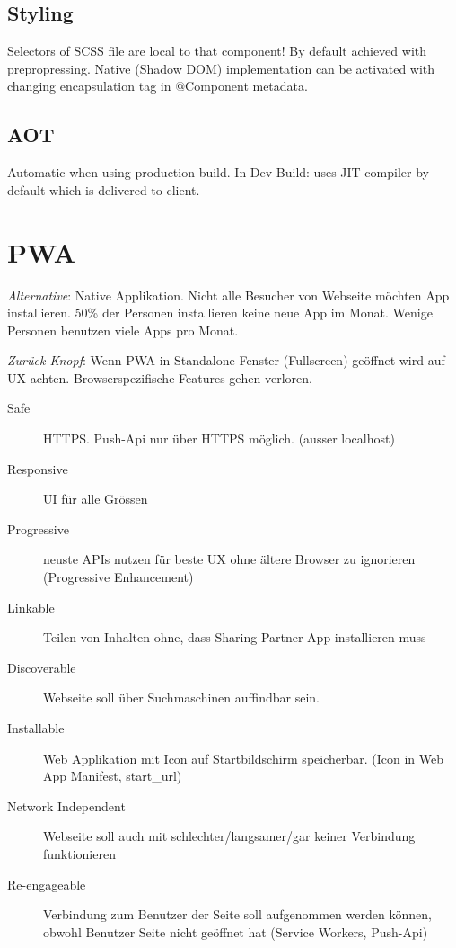\begin{multicols*}{2}
\subsection{Styling}
Selectors of SCSS file are local to that component! By default achieved with prepropressing. Native (Shadow DOM) implementation can be activated with changing encapsulation tag in @Component metadata.

\subsection{AOT}
Automatic when using production build. In Dev Build: uses JIT compiler by default which is delivered to client.

\section{PWA}
\textit{Alternative}: Native Applikation. Nicht alle Besucher von Webseite möchten App installieren. 50\% der Personen installieren keine neue App im Monat. Wenige Personen benutzen viele Apps pro Monat.

\textit{Zurück Knopf}: Wenn PWA in Standalone Fenster (Fullscreen) geöffnet wird auf UX achten. Browserspezifische Features gehen verloren.

\begin{description}
    \item[Safe] HTTPS. Push-Api nur über HTTPS möglich. (ausser localhost)
    \item[Responsive] UI für alle Grössen
    \item[Progressive] neuste APIs nutzen für beste UX ohne ältere Browser zu ignorieren (Progressive Enhancement)
    \item[Linkable] Teilen von Inhalten ohne, dass Sharing Partner App installieren muss
    \item[Discoverable] Webseite soll über Suchmaschinen auffindbar sein.
    \item[Installable] Web Applikation mit Icon auf Startbildschirm speicherbar. (Icon in Web App Manifest, start\_url)
    \item[Network Independent] Webseite soll auch mit schlechter/langsamer/gar keiner Verbindung funktionieren
    \item[Re-engageable] Verbindung zum Benutzer der Seite soll aufgenommen werden können, obwohl Benutzer Seite nicht geöffnet hat (Service Workers, Push-Api)
\end{description}


\end{multicols*}
